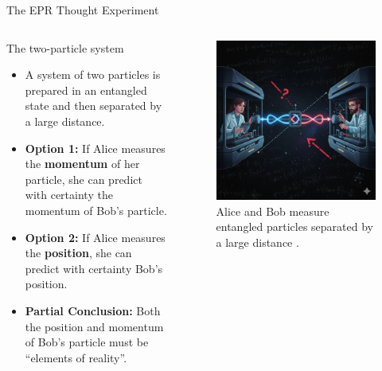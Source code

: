 \begin{frame}{The EPR Thought Experiment}

  \begin{columns}[T] %
    \begin{column}{0.6\textwidth}
      \begin{block}{The two-particle system}
        \begin{itemize}[<+->]
          \item A system of two particles is prepared in an entangled state and then separated by a large distance.
          \item \textbf{Option 1:} If Alice measures the \textbf{momentum} of her particle, she can predict with certainty the momentum of Bob's particle.
          \item \textbf{Option 2:} If Alice measures the \textbf{position}, she can predict with certainty Bob's position.
          \item \textbf{Partial Conclusion:} Both the position and momentum of Bob's particle must be ``elements of reality''.
        \end{itemize}
      \end{block}
    \end{column}

    \begin{column}{0.4\textwidth}
      \begin{figure}
        \centering
        \includegraphics[width=\linewidth]{images/epr_experiment.png}
        \caption{Alice and Bob measure entangled particles separated by a large distance \cite{Google2025_AliceBob}.}
      \end{figure}
    \end{column}
  \end{columns}

\end{frame}

